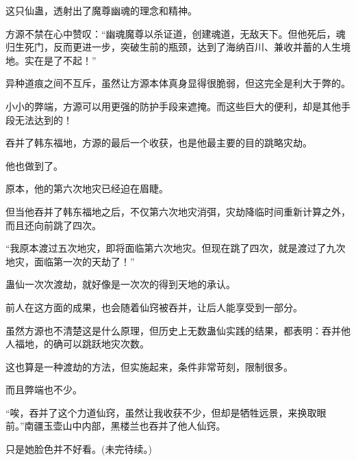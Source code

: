 \begin{this_body}
这只仙蛊，透射出了魔尊幽魂的理念和精神。

方源不禁在心中赞叹：“幽魂魔尊以杀证道，创建魂道，无敌天下。但他死后，魂归生死门，反而更进一步，突破生前的瓶颈，达到了海纳百川、兼收并蓄的人生境地。实在是了不起！”

异种道痕之间不互斥，虽然让方源本体真身显得很脆弱，但这完全是利大于弊的。

小小的弊端，方源可以用更强的防护手段来遮掩。而这些巨大的便利，却是其他手段无法达到的！

吞并了韩东福地，方源的最后一个收获，也是他最主要的目的跳略灾劫。

他也做到了。

原本，他的第六次地灾已经迫在眉睫。

但当他吞并了韩东福地之后，不仅第六次地灾消弭，灾劫降临时间重新计算之外，而且还向前跳了四次。

“我原本渡过五次地灾，即将面临第六次地灾。但现在跳了四次，就是渡过了九次地灾，面临第一次的天劫了！”

蛊仙一次次渡劫，就好像是一次次的得到天地的承认。

前人在这方面的成果，也会随着仙窍被吞并，让后人能享受到一部分。

虽然方源也不清楚这是什么原理，但历史上无数蛊仙实践的结果，都表明：吞并他人福地，的确可以跳跃地灾次数。

这也算是一种渡劫的方法，但实施起来，条件非常苛刻，限制很多。

而且弊端也不少。

“唉，吞并了这个力道仙窍，虽然让我收获不少，但却是牺牲远景，来换取眼前。”南疆玉壶山中内部，黑楼兰也吞并了他人仙窍。

只是她脸色并不好看。(未完待续。)

\end{this_body}

